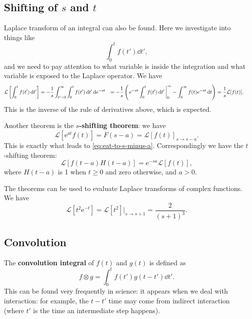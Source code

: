\documentclass[hyperref, a4paper]{article}
\newcommand*{\ee}{\mathrm{e}}
\newcommand*{\concept}[1]{{\textbf{#1}}}
\def\\{}%
\newcommand*{\laplace}{\mathcal{L}}
\newcommand*{\zerotoinf}{\int_{0}^{\infty}}
\begin{document}
\subsection{Shifting of $s$ and $t$}

Laplace transform of an integral can also be found. 
Here we investigate into things like 
\[
    \int_0^t f(t') \dd{t'},
\]
and we need to pay attention to what variable is inside the integration 
and what variable is exposed to the Laplace operator. 
We have 
\begin{equation}
    \begin{aligned}
        \laplace\left[
            \int_{0}^{t} f(t') \dd{t'}
        \right] &= - \frac{1}{s} \int_{t'=0}^{\infty} \int_{0}^{t} f(t') \dd{t'} \dd \ee^{-st} \\
        &= - \frac{1}{s} \left(
            \eval{\ee^{-st} \int_{0}^{t} f(t') \dd{t'}}_{0}^{\infty} - 
            \zerotoinf f(t) \ee^{-st} \dd{t} 
        \right) \\
        &= \frac{1}{s} \laplace[f(t)].
    \end{aligned}
\end{equation}
This is the inverse of the rule of derivatives above, 
which is expected. 

Another theorem is the \concept{$s$-shifting theorem}: 
we have 
\begin{equation}
    \laplace[\ee^{at} f(t)] = F(s-a) = \laplace[f(t)]_{s \to s - a}.
\end{equation}
This is exactly what leads to \eqref{eq:eat-to-s-minus-a}.
Correspondingly we have the $t$-shifting theorem: 
\begin{equation}
    \laplace[f(t-a) H(t-a)] = \ee^{-sa} \laplace[f(t)], 
\end{equation}
where $H(t-a)$ is 1 when $t \geq 0$ and zero otherwise,
and $a > 0$. 

The theorems can be used to evaluate Laplace transforms of complex functions. 
We have 
\begin{equation}
    \laplace[t^2 \ee^{-t}] = \laplace[t^2] |_{s \to s + 1}
    = \frac{2}{(s+1)^3}.
\end{equation}

\subsection{Convolution}

The \concept{convolution integral} of $f(t)$ and $g(t)$ is defined as 
\begin{equation}
    f \otimes g = \int_0^t f(t') g(t-t') \dd{t'}.
    \label{eq:laplace-conv}
\end{equation}
This can be found very frequently in science: 
it appears when we deal with interaction:
for example, the $t - t'$ time may come from indirect interaction 
(where $t'$ is the time an intermediate step happens).
\end{document}
